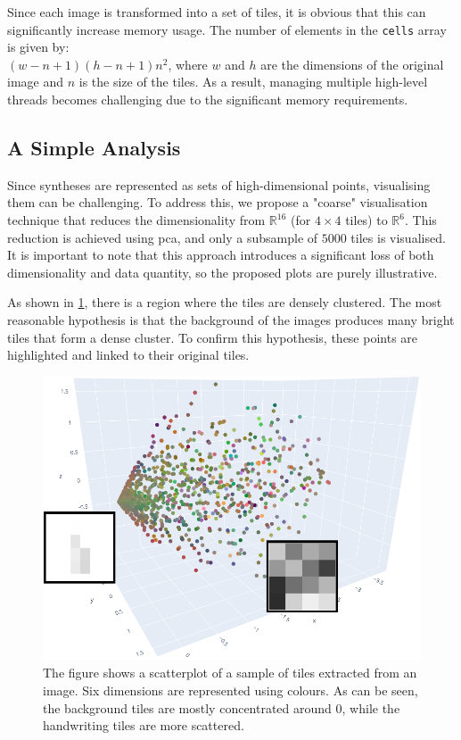 \begin{toReview}
    \noindent Since each image is transformed into a set of tiles, it is obvious that this can significantly increase memory usage. The number of elements in the \texttt{cells} array is given by:\\ $(w-n+1)(h-n+1)n^2$, where $w$ and $h$ are the dimensions of the original image and $n$ is the size of the tiles. As a result, managing multiple high-level threads becomes challenging due to the significant memory requirements.
	\newpage
    \subsection{A Simple Analysis} Since syntheses are represented as sets of high-dimensional points, visualising them can be challenging. To address this, we propose a "coarse" visualisation technique that reduces the dimensionality from $\mathbb{R}^{16}$ (for $4\times4$ tiles) to $\mathbb{R}^6$. This reduction is achieved using \gls{pca}, and only a subsample of $\num{5000}$ tiles is visualised. It is important to note that this approach introduces a significant loss of both dimensionality and data quantity, so the proposed plots are purely illustrative.

    \noindent As shown in \cref{fig:synth_glbvisual}, there is a region where the tiles are densely clustered. The most reasonable hypothesis is that the background of the images produces many bright tiles that form a dense cluster. To confirm this hypothesis, these points are highlighted and linked to their original tiles.

    \begin{figure}[H] \centering \includegraphics[width=0.8\linewidth]{Figures/synth_glbvisual.png}
    	\caption[Global visualisation of a synthesis using PCA]{The figure shows a scatterplot of a sample of tiles extracted from an image. Six dimensions are represented using colours. As can be seen, the background tiles are mostly concentrated around $0$, while the handwriting tiles are more scattered.}
    	\label{fig:synth_glbvisual}
    \end{figure}
	\newpage

\end{toReview}
